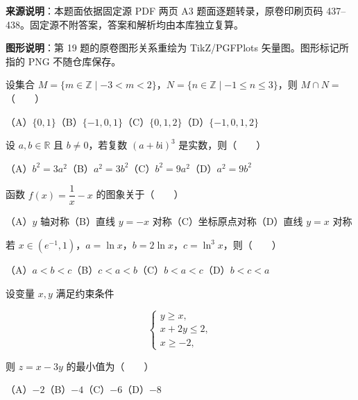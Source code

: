 


\begin{gktip}
\textbf{来源说明}：本题面依据固定源 PDF 两页 A3 题面逐题转录，原卷印刷页码 437–438。固定源不附答案，答案和解析均由本库独立复算。

\textbf{图形说明}：第 19 题的原卷图形关系重绘为 TikZ/PGFPlots 矢量图。图形标记所指的 PNG 不随仓库保存。
\end{gktip}


\begin{question}
设集合 $M=\{m\in\mathbb Z\mid-3<m<2\}$，$N=\{n\in\mathbb Z\mid-1\leqslant n\leqslant3\}$，则 $M\cap N=$\mbox{（　　）}

（A）$\{0,1\}$\quad（B）$\{-1,0,1\}$\quad（C）$\{0,1,2\}$\quad（D）$\{-1,0,1,2\}$

\end{question}
\begin{question}
设 $a,b\in\mathbb R$ 且 $b\ne0$，若复数 $(a+b\mathrm i)^3$ 是实数，则\mbox{（　　）}

（A）$b^2=3a^2$\quad（B）$a^2=3b^2$\quad（C）$b^2=9a^2$\quad（D）$a^2=9b^2$

\end{question}
\begin{question}
函数 $f(x)=\dfrac1x-x$ 的图象关于\mbox{（　　）}

（A）$y$ 轴对称\quad（B）直线 $y=-x$ 对称\quad（C）坐标原点对称\quad（D）直线 $y=x$ 对称

\end{question}
\begin{question}
若 $x\in(e^{-1},1)$，$a=\ln x$，$b=2\ln x$，$c=\ln^3x$，则\mbox{（　　）}

（A）$a<b<c$\quad（B）$c<a<b$\quad（C）$b<a<c$\quad（D）$b<c<a$

\end{question}
\begin{question}
设变量 $x,y$ 满足约束条件

\nopagebreak[4]
\[
\begin{cases}
y\geqslant x,\\
x+2y\leqslant2,\\
x\geqslant-2,
\end{cases}
\]

则 $z=x-3y$ 的最小值为\mbox{（　　）}

（A）$-2$\quad（B）$-4$\quad（C）$-6$\quad（D）$-8$

\end{question}
